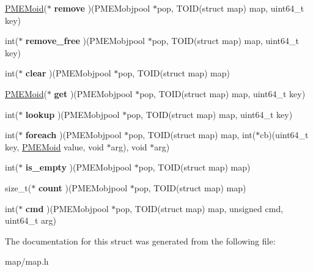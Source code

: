 \begin{DoxyCompactItemize}
\hyperlink{structpmemoid}{P\+M\+E\+Moid}($\ast$ {\bfseries remove} )(P\+M\+E\+Mobjpool $\ast$pop, T\+O\+ID(struct map) map, uint64\+\_\+t key)
\item 
\mbox{\label{structmap__ops_a9ea34bb0ed2da9c74ffc7f1711763817}} 
int($\ast$ {\bfseries remove\+\_\+free} )(P\+M\+E\+Mobjpool $\ast$pop, T\+O\+ID(struct map) map, uint64\+\_\+t key)
\item 
\mbox{\label{structmap__ops_a232fc50db9f6f2879d7d7c5383a09b19}} 
int($\ast$ {\bfseries clear} )(P\+M\+E\+Mobjpool $\ast$pop, T\+O\+ID(struct map) map)
\item 
\mbox{\label{structmap__ops_a55f0969470b229d08e2f9c86d43183b8}} 
\hyperlink{structpmemoid}{P\+M\+E\+Moid}($\ast$ {\bfseries get} )(P\+M\+E\+Mobjpool $\ast$pop, T\+O\+ID(struct map) map, uint64\+\_\+t key)
\item 
\mbox{\label{structmap__ops_a12c7c80d888b3718750f0080844e3807}} 
int($\ast$ {\bfseries lookup} )(P\+M\+E\+Mobjpool $\ast$pop, T\+O\+ID(struct map) map, uint64\+\_\+t key)
\item 
\mbox{\label{structmap__ops_afd8986f50ed0ab8b501b8144c5470bc0}} 
int($\ast$ {\bfseries foreach} )(P\+M\+E\+Mobjpool $\ast$pop, T\+O\+ID(struct map) map, int($\ast$cb)(uint64\+\_\+t key, \hyperlink{structpmemoid}{P\+M\+E\+Moid} value, void $\ast$arg), void $\ast$arg)
\item 
\mbox{\label{structmap__ops_a389b878160d136e18b2c6de2b37120a2}} 
int($\ast$ {\bfseries is\+\_\+empty} )(P\+M\+E\+Mobjpool $\ast$pop, T\+O\+ID(struct map) map)
\item 
\mbox{\label{structmap__ops_a01548382c83d67e311c49f09201033b1}} 
size\+\_\+t($\ast$ {\bfseries count} )(P\+M\+E\+Mobjpool $\ast$pop, T\+O\+ID(struct map) map)
\item 
\mbox{\label{structmap__ops_a8848b6f9a7cc1b466a9bfb3d5f10ddb3}} 
int($\ast$ {\bfseries cmd} )(P\+M\+E\+Mobjpool $\ast$pop, T\+O\+ID(struct map) map, unsigned cmd, uint64\+\_\+t arg)
\end{DoxyCompactItemize}


The documentation for this struct was generated from the following file\+:\begin{DoxyCompactItemize}
\item 
map/map.\+h\end{DoxyCompactItemize}
